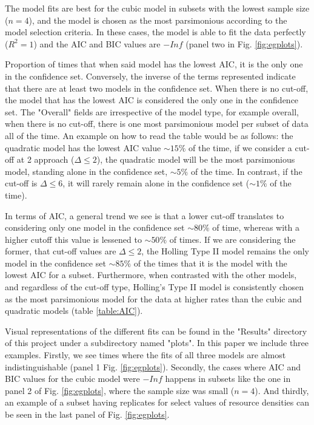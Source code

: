 \documentclass[11pt]{article}
\begin{document}
  The model fits are best for the cubic model in subsets with the lowest sample size ($n=4$), and the model is chosen as the most parsimonious according to the model selection criteria. In these cases, the model is able to fit the data perfectly ($R^2=1$) and the AIC and BIC values are $-Inf$ (panel two in Fig. \ref{fig:egplots}).
  
  \begin{table}[h]
    \centering
    \small
    \caption{Proportion of times that when said model has the lowest AIC, it is the only one in the confidence set. Conversely, the inverse of the terms represented indicate that there are at least two models in the confidence set. When there is no cut-off, the model that has the lowest AIC is considered the only one in the confidence set. The "Overall" fields are irrespective of the model type, for example overall, when there is no cut-off, there is one most parsimonious model per subset of data all of the time. An example on how to read the table would be as follows: the quadratic model has the lowest AIC value $\sim15\%$ of the time, if we consider a cut-off at 2 approach ($\Delta\leq2$), the quadratic model will be the most parsimonious model, standing alone in the confidence set, $\sim5\%$ of the time. In contrast, if the cut-off is $\Delta\leq6$, it will rarely remain alone in the confidence set ($\sim1\%$ of the time).}
    \label{table:AIC}
  \end{table}

  In terms of AIC, a general trend we see is that a lower cut-off translates to considering only one model in the confidence set $\sim80\%$ of time, whereas with a higher cutoff this value is lessened to $\sim50\%$ of times. If we are considering the former, that cut-off values are $\Delta\leq2$, the Holling Type II model remains the only model in the confidence set $\sim85\%$ of the times that it is the model with the lowest AIC for a subset. Furthermore, when contrasted with the other models, and regardless of the cut-off type, Holling's Type II model is consistently chosen as the most parsimonious model for the data at higher rates than the cubic and quadratic models (table \ref{table:AIC}).
  
  Visual representations of the different fits can be found in the "Results" directory of this project under a subdirectory named "plots". In this paper we include three examples. Firstly, we see times where the fits of all three models are almost indistinguishable (panel 1 Fig. \ref{fig:egplots}). Secondly, the cases where AIC and BIC values for the cubic model were $-Inf$ happens in subsets like the one in panel 2 of Fig. \ref{fig:egplots}, where the sample size was small ($n=4$). And thirdly, an example of a subset having replicates for select values of resource densities can be seen in the last panel of Fig. \ref{fig:egplots}.
\end{document}
